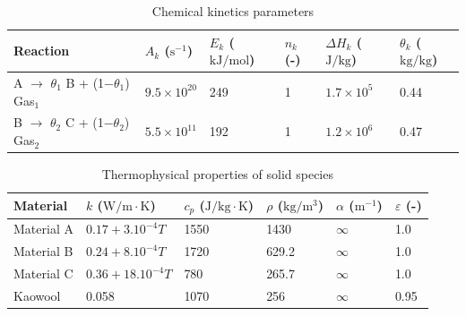 \documentclass[12pt]{article}
\begin{document}
\begin{table}[H]
\centering
\caption{Chemical kinetics parameters}
\label{tab:chem_props}
\begin{tabular}{@{}llllll@{}}
\toprule
Reaction & $A_k$ ($\mathrm{s^{-1}}$) & $E_k$ ($\mathrm{kJ/mol}$) & $n_k$ (-) & $\Delta H_k$ ($\mathrm{J/kg}$) & $\theta_k$ ($\mathrm{kg/kg}$) \\
\midrule
A $\rightarrow$ $\theta_1$ B + (1$-\theta_1$) Gas$_1$ & $9.5 \times 10^{20}$ & 249 & 1 & $1.7 \times 10^5$ & 0.44 \\
B $\rightarrow$ $\theta_2$ C + (1$-\theta_2$) Gas$_2$ & $5.5 \times 10^{11}$ & 192 & 1 & $1.2 \times 10^6$ & 0.47 \\
\bottomrule
\end{tabular}
\end{table}

\begin{table}[H]
\centering
\caption{Thermophysical properties of solid species}
\label{tab:phys_props}
\begin{tabular}{@{}llllll@{}}
\toprule
Material & $k$ ($\mathrm{W/m{\cdot}K}$) & $c_p$ ($\mathrm{J/kg{\cdot}K}$) & $\rho$ ($\mathrm{kg/m^3}$) & $\alpha$ ($\mathrm{m^{-1}}$) & $\varepsilon$ (-) \\
\midrule
Material A & $0.17 + 3.10^{-4}T$ & 1550 & 1430 & $\infty$ & 1.0 \\
Material B & $0.24 + 8.10^{-4}T$ & 1720 & 629.2 & $\infty$ & 1.0 \\
Material C & $0.36 + 18.10^{-4}T$ & 780  & 265.7 & $\infty$ & 1.0 \\
Kaowool    & 0.058               & 1070  & 256   & $\infty$ & 0.95 \\
\bottomrule
\end{tabular}
\end{table}
\end{document}
